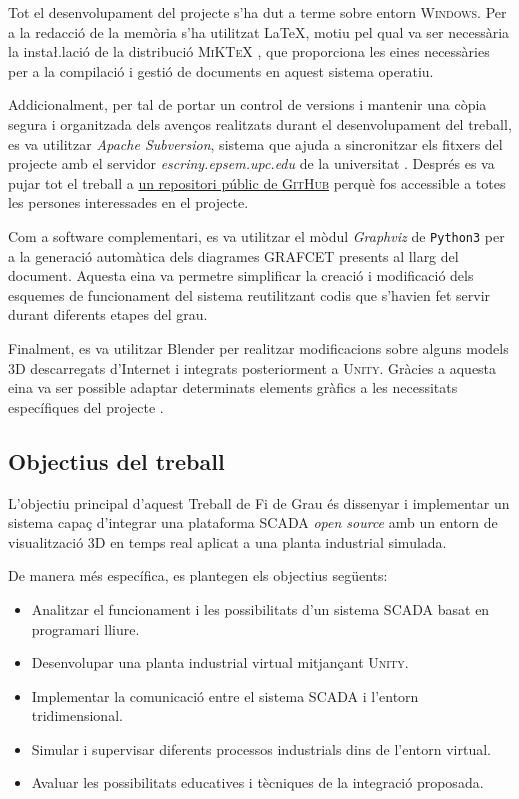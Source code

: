 \documentclass[a4paper,11pt,DIV=13,headings=normal,abstract=true,twoside=semi]{article}
\newcommand{\acro}[1]{\textsc{#1}}
\begin{document}
Tot el desenvolupament del projecte s'ha dut a terme sobre entorn \acro{Windows}. Per a la redacció de la memòria s'ha utilitzat \LaTeX{}, motiu pel qual va ser necessària la insta\l.lació de la distribució \acro{MiKTeX} \cite{Latex}, que proporciona les eines necessàries per a la compilació i gestió de documents en aquest sistema operatiu.

Addicionalment, per tal de portar un control de versions i mantenir una còpia segura i organitzada dels avenços realitzats durant el desenvolupament del treball, es va utilitzar \emph{Apache Subversion}, sistema que ajuda a sincronitzar els fitxers del projecte amb el servidor \emph{escriny.epsem.upc.edu} de la universitat \cite{Apache}. Després es va pujar tot el treball a \href{https://github.com/marcosgarciajamal-droid/TFG_MarcosGarcia} {un repositori públic de \acro{GitHub}} perquè fos accessible a totes les persones interessades en el projecte.

Com a software complementari, es va utilitzar el mòdul \emph{Graphviz} de \texttt{Python3} per a la generació automàtica dels diagrames \acro{\acro{GRAFCET}} presents al llarg del document. Aquesta eina va permetre simplificar la creació i modificació dels esquemes de funcionament del sistema reutilitzant codis que s'havien fet servir durant diferents etapes del grau.

Finalment, es va utilitzar Blender per realitzar modificacions sobre alguns models 3D descarregats d'Internet i integrats posteriorment a \acro{Unity}. Gràcies a aquesta eina va ser possible adaptar determinats elements gràfics a les necessitats específiques del projecte \cite{blender_download}.



\subsection{Objectius del treball}

L'objectiu principal d'aquest Treball de Fi de Grau és dissenyar i implementar un sistema capaç d'integrar una plataforma \acro{SCADA} \emph{open source} amb un entorn de visualització 3D en temps real aplicat a una planta industrial simulada.

De manera més específica, es plantegen els objectius següents:

\begin{itemize}
    \item Analitzar el funcionament i les possibilitats d'un sistema \acro{SCADA} basat en programari lliure.
    
    \item Desenvolupar una planta industrial virtual mitjançant \acro{Unity}.
    
    \item Implementar la comunicació entre el sistema \acro{SCADA} i l'entorn tridimensional.
    
    \item Simular i supervisar diferents processos industrials dins de l'entorn virtual.
    
    \item Avaluar les possibilitats educatives i tècniques de la integració proposada.
\end{itemize}
\end{document}
